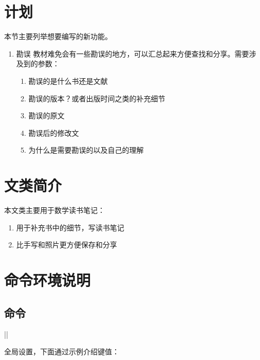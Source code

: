 \documentclass{xdyy-usermanual}
\begin{document}
\maketitle
\tableofcontents



\section{计划}

本节主要列举想要编写的新功能。

\begin{enumerate}
  \item 勘误
    教材难免会有一些勘误的地方，可以汇总起来方便查找和分享。需要涉及到的参数：
      \begin{enumerate}
        \item 勘误的是什么书还是文献
        \item 勘误的版本？或者出版时间之类的补充细节
        \item 勘误的原文
        \item 勘误后的修改文
        \item 为什么是需要勘误的以及自己的理解
      \end{enumerate}
\end{enumerate}


\section{文类简介}

本文类主要用于数学读书笔记：

\begin{enumerate}
  \item 用于补充书中的细节，写读书笔记
  \item 比手写和照片更方便保存和分享
\end{enumerate}


\section{命令环境说明}


\subsection{命令}

\begin{function}[added = 2022-02-17]{\xdyynotesetup}
  \begin{syntax}
    |\xdyynotesetup| 
  \end{syntax}
  全局设置，下面通过示例介绍键值：
  \begin{latexcode}
  \end{latexcode}
\end{function}
\end{document}

